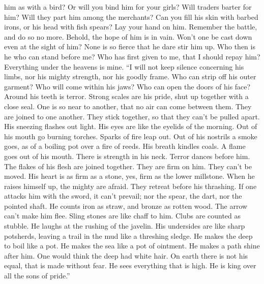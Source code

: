 him as with a bird? Or will you bind him for your girls? 
Will traders barter for him? Will they part him among the merchants?
 Can you fill his skin with barbed irons, or his head with
fish spears?  Lay your hand on him. Remember the battle,
and do so no more.  Behold, the hope of him is in vain.
Won't one be cast down even at the sight of him?  None is
so fierce that he dare stir him up. Who then is he who can stand before
me?  Who has first given to me, that I should repay him?
Everything under the heavens is mine.  ``I will not keep
silence concerning his limbs, nor his mighty strength, nor his goodly
frame.  Who can strip off his outer garment? Who will
come within his jaws?  Who can open the doors of his
face? Around his teeth is terror.  Strong scales are his
pride, shut up together with a close seal.  One is so
near to another, that no air can come between them.  They
are joined to one another. They stick together, so that they can't be
pulled apart.  His sneezing flashes out light. His eyes
are like the eyelids of the morning.  Out of his mouth go
burning torches. Sparks of fire leap out.  Out of his
nostrils a smoke goes, as of a boiling pot over a fire of reeds.
 His breath kindles coals. A flame goes out of his mouth.
 There is strength in his neck. Terror dances before him.
 The flakes of his flesh are joined together. They are
firm on him. They can't be moved.  His heart is as firm
as a stone, yes, firm as the lower millstone.  When he
raises himself up, the mighty are afraid. They retreat before his
thrashing.  If one attacks him with the sword, it can't
prevail; nor the spear, the dart, nor the pointed shaft. 
He counts iron as straw, and bronze as rotten wood.  The
arrow can't make him flee. Sling stones are like chaff to him.
 Clubs are counted as stubble. He laughs at the rushing
of the javelin.  His undersides are like sharp potsherds,
leaving a trail in the mud like a threshing sledge.  He
makes the deep to boil like a pot. He makes the sea like a pot of
ointment.  He makes a path shine after him. One would
think the deep had white hair.  On earth there is not his
equal, that is made without fear.  He sees everything
that is high. He is king over all the sons of pride.''

